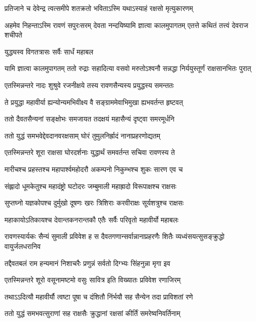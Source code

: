 \twolineshloka
{प्रतिजाने च देवेन्द्र त्वत्समीपे शतक्रतो}
{भविताऽस्मि यथाऽस्याहं रक्षसो मृत्युकारणम्} %

\threelineshloka
{अहमेव निहन्ताऽस्मि रावणं सपुरःसरम्}
{देवता नन्दयिष्यामि ज्ञात्वा कालमुपागतम्}
{एतत्ते कथितं तत्त्वं देवराज शचीपते} %

\onelineshloka
{युद्ध्यस्व विगतत्रासः सर्वैः सार्धं महाबल} %

\threelineshloka
{यामि ज्ञात्वा कालमुपागतम्}
{ततो रुद्राः सहादित्या वसवो मरुतोऽश्वनौ}
{सन्नद्धा निर्ययुस्तूर्णं राक्षसानभितः पुरात्} %

\twolineshloka
{एतस्मिन्नन्तरे नादः शुश्रुवे रजनीक्षये}
{तस्य रावणसैन्यस्य प्रयुद्धस्य समन्ततः} %

\twolineshloka
{ते प्रयुद्धा महावीर्या ह्यन्योन्यमभिवीक्ष्य वै}
{सङ्ग्राममेवाभिमुखा ह्यभवर्तन्त हृष्टवत्} %

\twolineshloka
{ततो दैवतसैन्यनां सङ्क्षोभः समजायत}
{तदक्षयं महासैन्यं दृष्ट्वा समरमूर्धनि} %

\twolineshloka
{ततो युद्धं समभवेद्देवदानवरक्षसाम्}
{घोरं तुमुलनिर्ह्रादं नानाप्रहरणोद्यतम्} %

\twolineshloka
{एतस्मिन्नन्तरे शूरा राक्षसा घोरदर्शनाः}
{युद्धार्थं समवर्तन्त सचिवा रावणस्य ते} %

\twolineshloka
{मारीचश्च प्रहस्तश्च महापार्श्वमहोदरौ}
{अकम्पनो निकुम्भश्च शुकः सारण एव च} %

\twolineshloka
{संह्लादो धूमकेतुश्च महादंष्ट्रो घटोदरः}
{जम्बुमाली महाह्रादो विरूपाक्षश्च राक्षसः} %

\twolineshloka
{सुप्तघ्नो यज्ञकोपश्च दुर्मुखो दूषणः खरः}
{त्रिशिराः करवीराक्षः सूर्यशत्रुश्च राक्षसः} %

\twolineshloka
{महाकायोऽतिकायश्च देवान्तकनरान्तकौ}
{एतैः सर्वैः परिवृतो महावीर्यो महाबलः} %

\threelineshloka
{रावणस्यार्यकः सैन्यं सुमाली प्रविवेश ह}
{स दैवतगणान्सर्वान्नानाप्रहरणैः शितैः}
{व्यध्वंसयत्सुसङ्क्रुद्धो वायुर्जलधरानिव} %

\twolineshloka
{तद्दैवतबलं राम हन्यमानं निशाचरैः}
{प्रणुन्नं सर्वतो दिग्भ्यः सिंहनुन्ना मृगा इव} %

\twolineshloka
{एतस्मिन्नन्तरे शूरो वसूनामष्टमो वसुः}
{सावित्र इति विख्यातः प्रविवेश रणाजिरम्} %

\twolineshloka
{तथाऽऽदित्यौ महावीर्यौ त्वष्टा पूषा च दंशितौ}
{निंर्भयौ सह सैन्येन तदा प्राविशतां रणे} %

\twolineshloka
{ततो युद्धं समभवत्सुराणां सह राक्षसैः}
{क्रुद्धानां रक्षसां कीर्तिं समरेष्वनिवर्तिनाम्} %

